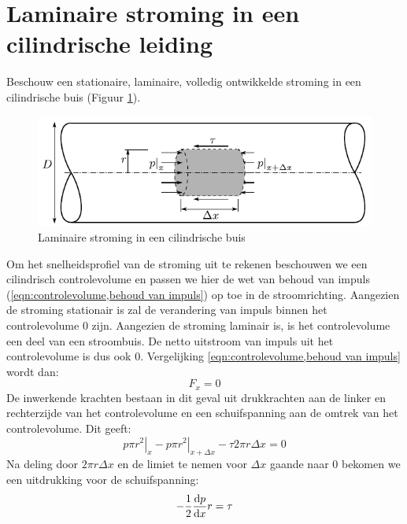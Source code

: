 	\section{Laminaire stroming in een cilindrische leiding}
	\label{sec:Laminaire stroming in een cilindrische leiding}
Beschouw een stationaire, laminaire, volledig ontwikkelde stroming in een cilindrische buis (Figuur \ref{fig:laminaire_stroming_in_buis}).
\begin{figure}[htb]
	\centering
	\includegraphics{fig/inwendige_stroming/Laminaire_stroming_in_buis}
	\caption{Laminaire stroming in een cilindrische buis}
	\label{fig:laminaire_stroming_in_buis}
\end{figure}
Om het snelheidsprofiel van de stroming uit te rekenen beschouwen we een cilindrisch controlevolume en passen we hier de wet van behoud van impuls (\ref{eqn:controlevolume,behoud van impuls}) op toe in de stroomrichting. Aangezien de stroming stationair is zal de verandering van impuls binnen het controlevolume $0$ zijn. Aangezien de stroming laminair is, is het controlevolume een deel van een stroombuis. De netto uitstroom van impuls uit het controlevolume is dus ook $0$. Vergelijking \ref{eqn:controlevolume,behoud van impuls} wordt dan:
\begin{equation}
	F_x = 0
\end{equation}
De inwerkende krachten bestaan in dit geval uit drukkrachten aan de linker en rechterzijde van het controlevolume en een schuifspanning aan de omtrek van het controlevolume. Dit geeft:
\begin{equation}
	\left. p \pi r^2\right|_{x} - \left. p \pi r^2\right|_{x+\Delta x} -  \tau 2 \pi r \Delta x = 0
\end{equation}
Na deling door $2\pi r \Delta x$ en de limiet te nemen voor $\Delta x$ gaande naar $0$ bekomen we een uitdrukking voor de schuifspanning:
\begin{equation}
	-\frac{1}{2} \frac{\mathrm{d} p}{\mathrm{d} x} r= \tau
	\label{eqn:drukgradient}
\end{equation}

